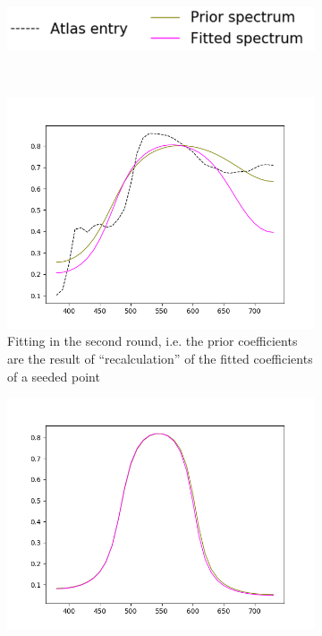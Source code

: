 \begin{figure}[t]
	\centering
	\begin{subfigure}[t]{0.4\textwidth}
		\includegraphics[width=\linewidth]{img/cost_functions_regular_legend.png}
	\end{subfigure} \\
	\begin{subfigure}[t]{0.45\textwidth}
		\includegraphics[width=\linewidth]{img/cost_functions_regular_round2.png}
		\caption{Fitting in the second round, i.e. the prior coefficients are the result of ``recalculation'' of the fitted coefficients of a seeded point}
		\label{fig:costFunctionsRegularRound2}
	\end{subfigure} \hspace{0.1em}
	\begin{subfigure}[t]{0.45\textwidth}
		\includegraphics[width=\linewidth,height=0.2\textheight]{img/cost_functions_regular_round8.png}

\end{subfigure}
\end{figure}
